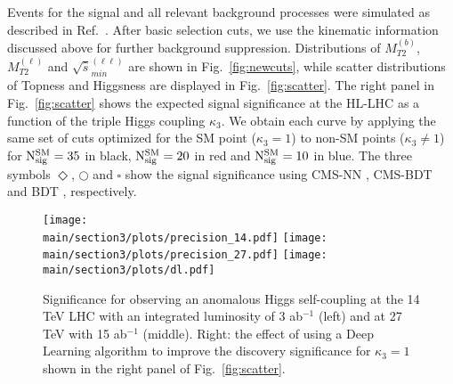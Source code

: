 Events for the signal and all relevant background processes were simulated as described in Ref.~\cite{Kim:2018cxf}. After basic selection cuts, we use the kinematic information  discussed above for further background suppression. Distributions of $M_{T2}^{(b)}$, $M_{T2}^{(\ell)}$ and $\sqrt{\hat{s}}_{min}^{(\ell\ell)}$ are shown in Fig.~\ref{fig:newcuts}, while scatter distributions of Topness and Higgsness are displayed in Fig.~\ref{fig:scatter}. 
%
The right panel in Fig.~\ref{fig:scatter} shows the expected signal significance at the HL-LHC as a function of the triple Higgs coupling $\kappa_3$. We obtain each curve by applying the same set of cuts optimized for the SM point ($\kappa_3=1$) to non-SM points ($\kappa_3 \neq 1$) for ${\rm N_{sig}^{SM}}=35$ in black, ${\rm N_{sig}^{SM}}=20$ in red and ${\rm N_{sig}^{SM}}=10$ in blue. The three symbols {\color{red}$\Diamond$}, {\color{black}$\bigcirc$} and {\color{blue}$\square$} show the signal significance using CMS-NN \cite{CMS:2015nat}, CMS-BDT \cite{CMS:2017cwx} and BDT \cite{Adhikary:2017jtu}, respectively.




%
\begin{figure}[t]
\centering
\texttt{[image: \\main/section3/plots/precision\_14.pdf]}   \hspace*{0.cm}
\texttt{[image: \\main/section3/plots/precision\_27.pdf]}   \hspace*{-0.cm}
\texttt{[image: \\main/section3/plots/dl.pdf]}   
\caption{\label{fig:k3precision} 
Significance for observing an anomalous Higgs self-coupling at the 14 TeV LHC with an integrated luminosity of 3 ab$^{-1}$ (left) and at 27 TeV with 15 ab$^{-1}$ (middle).
Right: the effect of using a Deep Learning algorithm to improve the discovery significance for $\kappa_3=1$ shown in 
the right panel of Fig.~\ref{fig:scatter}.
}
\end{figure}
%

